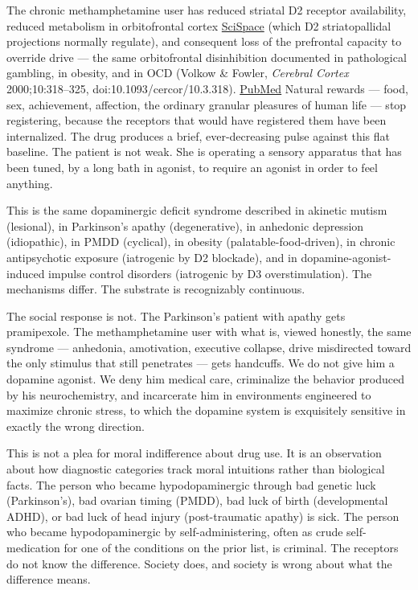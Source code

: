 The chronic methamphetamine user has reduced striatal D2 receptor availability, reduced metabolism in orbitofrontal cortex \href{https://scispace.com/papers/low-level-of-brain-dopamine-d2-receptors-in-methamphetamine-1xd66wjze9}{SciSpace} (which D2 striatopallidal projections normally regulate), and consequent loss of the prefrontal capacity to override drive --- the same orbitofrontal disinhibition documented in pathological gambling, in obesity, and in OCD (Volkow \& Fowler, \emph{Cerebral Cortex} 2000;10:318--325, doi:10.1093/cercor/10.3.318). \href{https://pubmed.ncbi.nlm.nih.gov/11729018/}{PubMed} Natural rewards --- food, sex, achievement, affection, the ordinary granular pleasures of human life --- stop registering, because the receptors that would have registered them have been internalized. The drug produces a brief, ever-decreasing pulse against this flat baseline. The patient is not weak. She is operating a sensory apparatus that has been tuned, by a long bath in agonist, to require an agonist in order to feel anything.

This is the same dopaminergic deficit syndrome described in akinetic mutism (lesional), in Parkinson's apathy (degenerative), in anhedonic depression (idiopathic), in PMDD (cyclical), in obesity (palatable-food-driven), in chronic antipsychotic exposure (iatrogenic by D2 blockade), and in dopamine-agonist-induced impulse control disorders (iatrogenic by D3 overstimulation). The mechanisms differ. The substrate is recognizably continuous.

The social response is not. The Parkinson's patient with apathy gets pramipexole. The methamphetamine user with what is, viewed honestly, the same syndrome --- anhedonia, amotivation, executive collapse, drive misdirected toward the only stimulus that still penetrates --- gets handcuffs. We do not give him a dopamine agonist. We deny him medical care, criminalize the behavior produced by his neurochemistry, and incarcerate him in environments engineered to maximize chronic stress, to which the dopamine system is exquisitely sensitive in exactly the wrong direction.

This is not a plea for moral indifference about drug use. It is an observation about how diagnostic categories track moral intuitions rather than biological facts. The person who became hypodopaminergic through bad genetic luck (Parkinson's), bad ovarian timing (PMDD), bad luck of birth (developmental ADHD), or bad luck of head injury (post-traumatic apathy) is sick. The person who became hypodopaminergic by self-administering, often as crude self-medication for one of the conditions on the prior list, is criminal. The receptors do not know the difference. Society does, and society is wrong about what the difference means.

